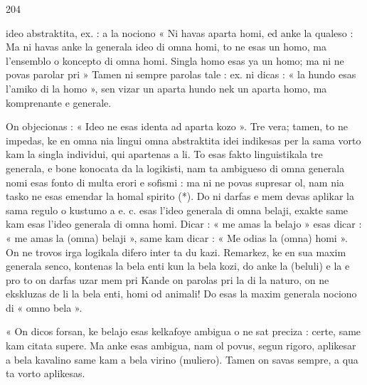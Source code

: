 \begin{VUpage}[208]{204}
\VUpageNote{8.13pt}

\VUcontinue
ideo abstraktita, ex. : a la nociono  « Ni havas aparta homi,\nl
ed anke la qualeso :  Ma ni havas anke la generala ideo di\nl
omna homi, to ne esas un homo, ma l'ensemblo o koncepto di omna\nl
homi. Singla homo esas ya un homo; ma ni ne povas parolar pri\nl
{} » Tamen ni sempre parolas tale : ex. ni dicas :\nl
« la hundo esas l'amiko di la homo », sen vizar un aparta hundo nek\nl
un aparta homo, ma komprenante  e  generale.

On objecionas : « Ideo ne esas identa ad aparta kozo ». Tre vera;\nl
tamen, to ne impedas, ke en omna nia lingui omna abstraktita idei\nl
indikesas per la sama vorto kam la singla individui, qui apartenas\nl
a li. To esas fakto linguistikala tre generala, e bone konocata da la\nl
logikisti, nam ta ambigueso di omna generala nomi esas fonto di\nl
multa erori e sofismi : ma ni ne povas supresar ol, nam nia tasko\nl
ne esas emendar la homal spirito (*). Do ni darfas e mem devas\nl
aplikar la sama regulo o kustumo a  e. c.\nl
{} esas l'ideo generala di omna belaji, exakte same kam\nl
{} esas l'ideo generala di omna homi. Dicar : « me amas la\nl
belajo » esas dicar : « me amas la (omna) belaji », same kam dicar :\nl
« Me odias la (omna) homi ». On ne trovos irga logikala difero inter\nl
ta du kazi. Remarkez, ke  en sua maxim generala senco,\nl
kontenas la bela enti kun la bela kozi, do anke la  (beluli) e la\nl
{} e pro to on darfas uzar  mem pri  Kande on\nl
parolas pri la  di la naturo, on ne ekskluzas de li la bela enti,\nl
homi od animali! Do  esas la maxim generala nociono di\nl
« omno bela ».

« On dicos forsan, ke belajo esas kelkafoye ambigua o ne sat\nl
preciza : certe, same kam  citata supere. Ma anke \nl
esas ambigua, nam ol povus, segun rigoro, aplikesar a bela kavalino\nl
same kam a bela virino (muliero). Tamen on savas sempre, a qua ta\nl
vorto aplikesas.


\end{VUpage}
